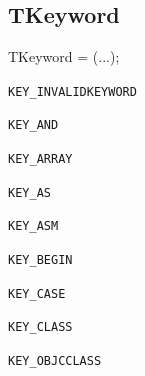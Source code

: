 \documentclass{report}
\newif\ifpdf
\begin{document}
\subsection*{TKeyword}
\fi
\label{PasDoc_Tokenizer-TKeyword}
\begin{list}{}{
\setlength{\itemindent}{0cm}
\setlength{\listparindent}{0cm}
\setlength{\leftmargin}{\evensidemargin}
\addtolength{\leftmargin}{\tmplength}
\settowidth{\labelsep}{X}
\addtolength{\leftmargin}{\labelsep}
\setlength{\labelwidth}{\tmplength}
}
\item[\textbf{Declaration}\hfill]
\ifpdf
\begin{flushleft}
\fi
\begin{ttfamily}
TKeyword = (...);\end{ttfamily}

\ifpdf
\end{flushleft}
\fi

\par
\item[\textbf{Description}]
 \item[\textbf{Values}]
\begin{description}
\item[\texttt{KEY{\_}INVALIDKEYWORD}] \label{PasDoc_Tokenizer-KEY_INVALIDKEYWORD}
\index{}
 
\item[\texttt{KEY{\_}AND}] \label{PasDoc_Tokenizer-KEY_AND}
\index{}
 
\item[\texttt{KEY{\_}ARRAY}] \label{PasDoc_Tokenizer-KEY_ARRAY}
\index{}
 
\item[\texttt{KEY{\_}AS}] \label{PasDoc_Tokenizer-KEY_AS}
\index{}
 
\item[\texttt{KEY{\_}ASM}] \label{PasDoc_Tokenizer-KEY_ASM}
\index{}
 
\item[\texttt{KEY{\_}BEGIN}] \label{PasDoc_Tokenizer-KEY_BEGIN}
\index{}
 
\item[\texttt{KEY{\_}CASE}] \label{PasDoc_Tokenizer-KEY_CASE}
\index{}
 
\item[\texttt{KEY{\_}CLASS}] \label{PasDoc_Tokenizer-KEY_CLASS}
\index{}
 
\item[\texttt{KEY{\_}OBJCCLASS}] \label{PasDoc_Tokenizer-KEY_OBJCCLASS}
\index{}
 

\end{description}
\end{list}
\end{document}
